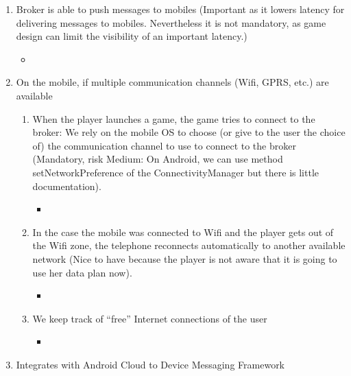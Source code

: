 \begin{enumerate}
\begin{itemize}
\item {}
\end{itemize}
\item Broker is able to push messages to mobiles (Important as it
  lowers latency for delivering messages to mobiles. Nevertheless it
  is not mandatory, as game design can limit the visibility of an
  important latency.)
\label{R_12}
\begin{itemize}
\item {}
\end{itemize}
\item On the mobile, if multiple communication channels (Wifi, GPRS,
  etc.) are available
\label{R_13}
\begin{enumerate}
\item When the player launches a game, the game tries to connect
  to the broker: We rely on the mobile OS to choose (or give to the
  user the choice of) the communication channel to use to connect to
  the broker (Mandatory, risk Medium: On Android, we can use method
  setNetworkPreference of the ConnectivityManager but there is little
  documentation).
\label{R_13_a}
\begin{itemize}
\item {}
\end{itemize}
\item In the case the mobile was connected to Wifi and the player gets
  out of the Wifi zone, the telephone reconnects automatically to
  another available network (Nice to have because the player is not
  aware that it is going to use her data plan now).
\label{R_13_b}
\begin{itemize}
\item {}
\end{itemize}
\item We keep track of ``free'' Internet connections of the user
\label{R_13_c}
\begin{itemize}
\item {}
\end{itemize}
\end{enumerate}
\item Integrates with Android Cloud to Device Messaging Framework

\end{enumerate}
